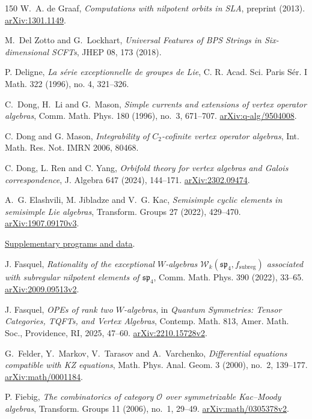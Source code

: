 \documentclass[11pt,a4paper]{amsart}
\numberwithin{equation}{section}
\theoremstyle{definition}
\theoremstyle{remark}
\newcommand{\arxiv}[1]{\href{https://arxiv.org/abs/#1}{arXiv:#1}}
\begin{document}
\begin{thebibliography}{150}
 W.~A. de Graaf,
\emph{Computations with nilpotent orbits in SLA},
preprint (2013). \arxiv{1301.1149}.

M.~Del Zotto and G.~Lockhart,
\emph{Universal Features of BPS Strings in Six-dimensional SCFTs},
JHEP {08}, 173 (2018).

 P. Deligne,
\emph{La s\'erie exceptionnelle de groupes de Lie},
C. R. Acad. Sci. Paris S\'er. I Math. 322 (1996), no. 4, 321--326.

 C.~Dong, H.~Li and G.~Mason,
\emph{Simple currents and extensions of vertex operator algebras},
Comm. Math. Phys. 180 (1996), no.~3, 671--707. \arxiv{q-alg/9504008}.

 C. Dong and G. Mason,
\emph{Integrability of $C_2$-cofinite vertex operator algebras},
Int. Math. Res. Not. IMRN 2006, 80468.


 C. Dong, L. Ren and C. Yang,
\emph{Orbifold theory for vertex algebras and Galois correspondence},
J. Algebra 647 (2024), 144--171. \arxiv{2302.09474}.

 A.~G. Elashvili, M. Jibladze and V.~G. Kac,
\emph{Semisimple cyclic elements in semisimple Lie algebras},
Transform. Groups 27 (2022), 429--470. \arxiv{1907.09170v3}.


 \href{https://www.dropbox.com/scl/fi/y8irrb3gqnvyfiva8a4l5/All_simple_quasi_lisse_classification_programs.zip?rlkey=cpfb8lw12hwpgdzus8rptb3qh&st=zi221i51&dl=0}{Supplementary programs and data}.

 J. Fasquel,
\emph{Rationality of the exceptional $W$-algebras $\mathcal W_k(\mathfrak{sp}_4,f_{\mathrm{subreg}})$ associated with subregular nilpotent elements of $\mathfrak{sp}_4$},
Comm. Math. Phys. 390 (2022), 33--65. \arxiv{2009.09513v2}.

 J. Fasquel,
\emph{OPEs of rank two $W$-algebras},
in \emph{Quantum Symmetries: Tensor Categories, TQFTs, and Vertex Algebras}, Contemp. Math. 813, Amer. Math. Soc., Providence, RI, 2025, 47--60. \arxiv{2210.15728v2}.

 G.~Felder, Y.~Markov, V.~Tarasov and A.~Varchenko,
\emph{Differential equations compatible with KZ equations},
Math. Phys. Anal. Geom. 3 (2000), no.~2, 139--177. \arxiv{math/0001184}.

 P. Fiebig,
\emph{The combinatorics of category $\mathcal O$ over symmetrizable Kac--Moody algebras},
Transform. Groups 11 (2006), no.~1, 29--49. \arxiv{math/0305378v2}.


\end{thebibliography}
\end{document}
